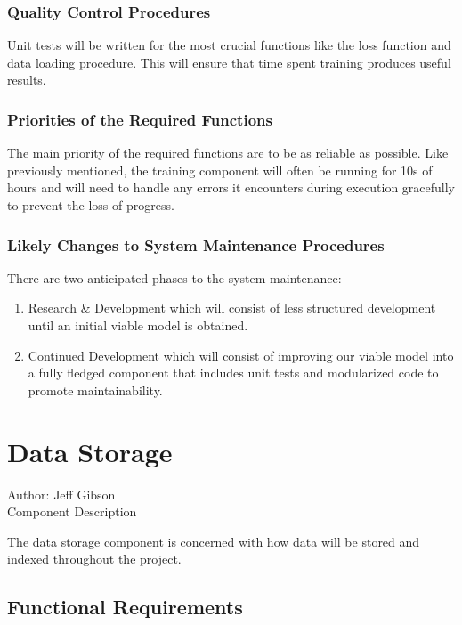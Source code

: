 \documentclass[12pt]{article}
\begin{document}
\subsubsection {Quality Control Procedures}

Unit tests will be written for the most crucial functions like the loss function and data loading procedure. This will ensure that time spent training produces useful results.

\subsubsection {Priorities of the Required Functions}

The main priority of the required functions are to be as reliable as possible. Like previously mentioned, the training component will often be running for 10s of hours and will need to handle any errors it encounters during execution gracefully to prevent the loss of progress.

\subsubsection {Likely Changes to System Maintenance Procedures}

There are two anticipated phases to the system maintenance:
\begin{enumerate}
    \item Research \& Development which will consist of less structured development until an initial viable model is obtained.
    \item Continued Development which will consist of improving our viable model into a fully fledged component that includes unit tests and modularized code to promote maintainability.
\end{enumerate}

\section{Data Storage}
Author: Jeff Gibson\\

\noindent Component Description

The data storage component is concerned with how data will be stored and indexed throughout the project.

\subsection{Functional Requirements}
\end{document}
